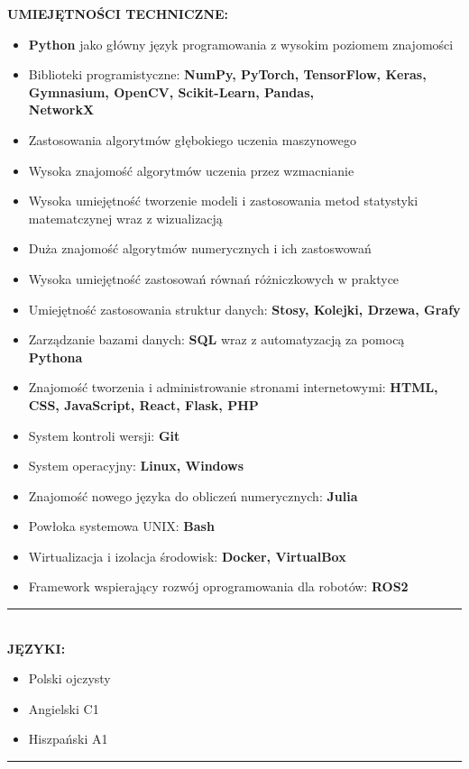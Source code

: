\documentclass[10pt]{article}
\begin{document}
\noindent \fontsize{14pt}{14pt}\selectfont \textbf{\color{Violet}UMIEJĘTNOŚCI TECHNICZNE:}
\fontsize{10pt}{10pt}\selectfont
\begin{itemize}[leftmargin=*]
    \item \textbf{Python} jako główny język programowania z wysokim poziomem znajomości 
    \item Biblioteki programistyczne: \textbf{NumPy, PyTorch, TensorFlow, Keras, Gymnasium, OpenCV, Scikit-Learn, Pandas, \\ NetworkX}
    \item Zastosowania algorytmów głębokiego uczenia maszynowego
    \item Wysoka znajomość algorytmów uczenia przez wzmacnianie
    \item Wysoka umiejętność tworzenie modeli i zastosowania metod statystyki matematczynej wraz z wizualizacją
    \item Duża znajomość algorytmów numerycznych i ich zastoswowań
    \item Wysoka umiejętność zastosowań równań różniczkowych w praktyce
    \item Umiejętność zastosowania struktur danych: \textbf{Stosy, Kolejki, Drzewa, Grafy}
    \item Zarządzanie bazami danych: \textbf{SQL} wraz z automatyzacją za pomocą \textbf{Pythona}
    \item Znajomość tworzenia i administrowanie stronami internetowymi: \textbf{HTML, CSS, JavaScript, React, Flask, PHP}
    \item System kontroli wersji: \textbf{Git}
    \item System operacyjny: \textbf{Linux, Windows}
    \item Znajomość nowego języka do obliczeń numerycznych: \textbf{Julia}
    \item Powłoka systemowa UNIX: \textbf{Bash} 
    \item Wirtualizacja i izolacja środowisk: \textbf{Docker, VirtualBox}
    \item Framework wspierający rozwój oprogramowania dla robotów: \textbf{ROS2}
\end{itemize}
\rule{17cm}{1pt} \\

\fontsize{14pt}{14pt}\selectfont \textbf{\color{Violet}JĘZYKI:}
\fontsize{10pt}{10pt}\selectfont
\begin{itemize}[leftmargin=*]
    \item Polski ojczysty
    \item Angielski C1
    \item Hiszpański A1
\end{itemize}
\rule{17cm}{1pt} \\
\end{document}

